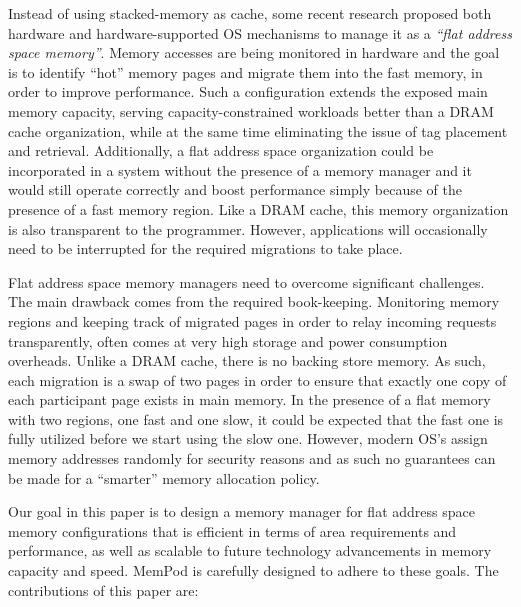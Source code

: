 Instead of using stacked-memory as cache, some recent research \cite{sim-micro2014,meswani-HPCA21} proposed both hardware and hardware-supported OS mechanisms to manage it as a \emph{``flat address space memory''}. Memory accesses are being monitored in hardware and the goal is to identify ``hot'' memory pages and migrate them into the fast memory, in order to improve performance. Such a configuration extends the exposed main memory capacity, serving capacity-constrained workloads better than a DRAM cache organization, while at the same time eliminating the issue of tag placement and retrieval. Additionally, a flat address space organization could be incorporated in a system without the presence of a memory manager and it would still operate correctly and boost performance simply because of the presence of a fast memory region. Like a DRAM cache, this memory organization is also transparent to the programmer. However, applications will occasionally need to be interrupted for the required migrations to take place. 

Flat address space memory managers need to overcome significant challenges. The main drawback comes from the required book-keeping. Monitoring memory regions and keeping track of migrated pages in order to relay incoming requests transparently, often comes at very high storage and power consumption overheads. Unlike a DRAM cache, there is no backing store memory. As such, each migration is a swap of two pages in order to ensure that exactly one copy of each participant page exists in main memory. In the presence of a flat memory with two regions, one fast and one slow, it could be expected that the fast one is fully utilized before we start using the slow one. However, modern OS's assign memory addresses randomly for security reasons  and as such no guarantees can be made for a ``smarter'' memory allocation policy.

Our goal in this paper is to design a memory manager for flat address space memory configurations that is efficient in terms of area requirements and performance, as well as scalable to future technology advancements in memory capacity and speed. MemPod is carefully designed to adhere to these goals. The contributions of this paper are:

